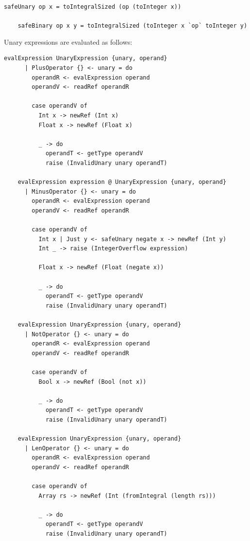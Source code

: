 \documentclass[UdineBachThesis,american,11pt]{PhdThesis}
\begin{document}
  \begin{lstlisting}[gobble=4,basicstyle=\ttfamily\small]
    safeUnary op x = toIntegralSized (op (toInteger x))

    safeBinary op x y = toIntegralSized (toInteger x `op` toInteger y)
  \end{lstlisting}

  \newpage

  Unary expressions are evaluated as follows:

  \begin{lstlisting}[gobble=4,basicstyle=\ttfamily\small]
    evalExpression UnaryExpression {unary, operand}
      | PlusOperator {} <- unary = do
        operandR <- evalExpression operand
        operandV <- readRef operandR

        case operandV of
          Int x -> newRef (Int x)
          Float x -> newRef (Float x)

          _ -> do
            operandT <- getType operandV
            raise (InvalidUnary unary operandT)

    evalExpression expression @ UnaryExpression {unary, operand}
      | MinusOperator {} <- unary = do
        operandR <- evalExpression operand
        operandV <- readRef operandR

        case operandV of
          Int x | Just y <- safeUnary negate x -> newRef (Int y)
          Int _ -> raise (IntegerOverflow expression)

          Float x -> newRef (Float (negate x))

          _ -> do
            operandT <- getType operandV
            raise (InvalidUnary unary operandT)

    evalExpression UnaryExpression {unary, operand}
      | NotOperator {} <- unary = do
        operandR <- evalExpression operand
        operandV <- readRef operandR

        case operandV of
          Bool x -> newRef (Bool (not x))

          _ -> do
            operandT <- getType operandV
            raise (InvalidUnary unary operandT)

    evalExpression UnaryExpression {unary, operand}
      | LenOperator {} <- unary = do
        operandR <- evalExpression operand
        operandV <- readRef operandR

        case operandV of
          Array rs -> newRef (Int (fromIntegral (length rs)))

          _ -> do
            operandT <- getType operandV
            raise (InvalidUnary unary operandT)
  \end{lstlisting}
\end{document}

